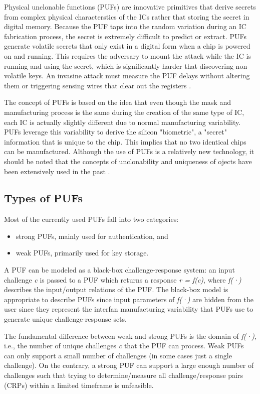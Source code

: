 Physical unclonable functions (PUFs) are innovative primitives that derive secrets from complex physical characterstics of the ICs rather that storing the secret in digital memory. Because the PUF taps into the random variation during an IC fabrication process, the secret is extremely difficult to predict or extract. PUFs generate volatile secrets that only exist in a digital form when a chip is powered on and running. This requires the adversary to mount the attack while the IC is running and using the secret, which is significantly harder that discovering non-volatile keys. An invasine attack must measure the PUF delays without altering them or triggering sensing wires that clear out the registers \cite{PUF_Suh_Devadas}.

The concept of PUFs is based on the idea that even though the mask and manufacturing process is the same during the creation of the same type of IC, each IC is actually slightly different due to normal manufacturing variability. PUFs leverage this variability to derive the silicon "biometric", a "secret" information that is unique to the chip. This implies that no two identical chips can be manufactured.  
Although the use of PUFs is a relatively new technology, it should be noted that the concepts of unclonability and uniqueness of ojects have been extensively used in the past \cite{PUF_IEEE_Herder}.

\subsection{Types of PUFs}
Most of the currently used PUFs fall into two categories: 
\begin{itemize}
\item strong PUFs, mainly used for authentication, and 
\item weak PUFs, primarily used for key storage.
\end{itemize}

A PUF can be modeled as a black-box challenge-response system: an input challenge \emph{c} is passed to a PUF which returns a response \emph{r = f(c)}, where \emph{f(·)} describes the input/output relations of the PUF. The black-box model is appropriate to describe PUFs since input parameters of \emph{f(·)} are hidden from the user since they represent the interfan manufacturing variability that PUFs use to generate unique challenge-response sets.

The fundamental difference between weak and strong PUFs is the domain of \emph{f(·)}, i.e., the number of unique challenges \emph{c} that the PUF can process. Weak PUFs can only support a small number of challenges (in some cases just a single challenge). On the contrary, a strong PUF can support a large enough number of challenges such that trying to determine/measure all challenge/response pairs (CRPs) within a limited timeframe is unfeasible.

